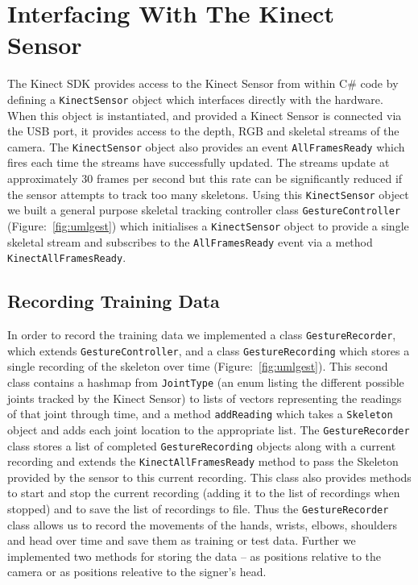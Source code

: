 \chapter{Interfacing With The Kinect Sensor}
\ifpdf
    \graphicspath{{Chapter3/Chapter3Figs/PNG/}{Chapter3/Chapter3Figs/PDF/}{Chapter3/Chapter3Figs/}}
\else
    \graphicspath{{Chapter3/Chapter3Figs/EPS/}{Chapter3/Chapter3Figs/}}
\fi



The Kinect SDK provides access to the Kinect Sensor from within C\# code by defining a \verb|KinectSensor| object which interfaces directly with the hardware. When this object is instantiated, and provided a Kinect Sensor is connected via the USB port, it provides access to the depth, RGB and skeletal streams of the camera. The \verb|KinectSensor| object also provides an event  \verb|AllFramesReady| which fires each time the streams have successfully updated. The streams update at approximately 30 frames per second but this rate can be significantly reduced if the sensor attempts to track too many skeletons. Using this \verb|KinectSensor| object we built a general purpose skeletal tracking controller class \verb|GestureController| (Figure:~\ref{fig:umlgest}) which initialises a \verb|KinectSensor| object to provide a single skeletal stream and subscribes to the \verb|AllFramesReady| event via a method \verb|KinectAllFramesReady|.

\section{Recording Training Data}
In order to record the training data we implemented a class \verb|GestureRecorder|, which extends \verb|GestureController|, and a class \verb|GestureRecording| which stores a single recording of the skeleton over time (Figure:~\ref{fig:umlgest}). This second class contains a hashmap from \verb|JointType| (an enum listing the different possible joints tracked by the Kinect Sensor) to lists of vectors representing the readings of that joint through time, and a method \verb|addReading| which takes a \verb|Skeleton| object and adds each joint location to the appropriate list. The \verb|GestureRecorder| class stores a list of completed \verb|GestureRecording| objects along with a current recording and extends the \verb|KinectAllFramesReady| method to pass the Skeleton provided by the sensor to this current recording. This class also provides methods to start and stop the current recording (adding it to the list of recordings when stopped) and to save the list of recordings to file. Thus the \verb|GestureRecorder| class allows us to record the movements of the hands, wrists, elbows, shoulders and head over time and save them as training or test data. Further we implemented two methods for storing the data -- as positions relative to the camera or as positions releative to the signer's head.

